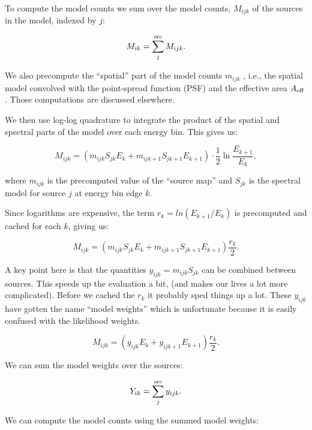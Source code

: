 \documentclass[preprint]{aastex}
\begin{document}
To compute the model counts we sum over the model counts, $M_{ijk}$ of
the sources in the model, indexed by $j$:

\begin{equation}
  M_{ik} =  \sum_j^{\rm src} M_{ijk}.
\end{equation}

\noindent We also precompute the ``spatial'' part of the model counts
$m_{ijk}$ , i.e., the spatial model convolved with the point-spread
function (PSF) and the effective area $A_{\rm eff}$.  Those
computations are discussed elsewhere.

We then use log-log quadrature to integrate the product of the spatial
and spectral parts of the model over each energy bin.  This gives us:

\begin{equation}
  M_{ijk} = (m_{ijk} S_{jk} E_k +  m_{ijk+1} S_{jk+1} E_{k+1}) \cdot \frac{1}{2} \ln\frac{E_{k+1}}{E_{k}},
\end{equation}

\noindent where $m_{ijk}$ is the precomputed value of the ``source
map'' and $S_{jk}$ is the spectral model for source $j$ at energy bin
edge $k$.

Since logarithms are expensive, the term $r_k = ln(E_{k+1}/E_{k})$ is
precomputed and cached for each $k$, giving us:

\begin{equation}
  M_{ijk} = (m_{ijk} S_{jk} E_k +  m_{ijk+1} S_{jk+1} E_{k+1}) \frac{r_k}{2}.
\end{equation}

\noindent A key point here is that the quantities $y_{ijk} = m_{ijk}
S_{jk}$ can be combined between sources.  This speeds up the
evaluation a bit, (and makes our lives a lot more complicated).
Before we cached the $r_k$ it probably sped things up a lot.  These
$y_{ijk}$ have gotten the name ``model weights'' which is unfortunate
because it is easily confused with the likelihood weights.

\begin{equation}
  M_{ijk} = (y_{ijk} E_k +  y_{ijk+1} E_{k+1}) \frac{r_k}{2}.
\end{equation}

\noindent We can sum the model weights over the sources:

\begin{equation}
  Y_{ik} = \sum_j^{\rm src} y_{ijk}.
\end{equation}

\noindent We can compute the model counts using the summed model
weights:
\end{document}
